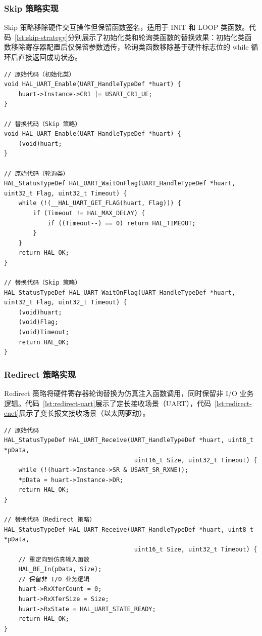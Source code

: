\subsubsection{Skip 策略实现}

Skip 策略移除硬件交互操作但保留函数签名，适用于 INIT 和 LOOP 类函数。代码~\ref{lst:skip-strategy}分别展示了初始化类和轮询类函数的替换效果：初始化类函数移除寄存器配置后仅保留参数透传，轮询类函数移除基于硬件标志位的 while 循环后直接返回成功状态。

\begin{lstlisting}[style=CStyle,abovecaptionskip=0pt,belowcaptionskip=0pt,caption=Skip 策略替换示例（初始化类和轮询类）,label=lst:skip-strategy]
// 原始代码（初始化类）
void HAL_UART_Enable(UART_HandleTypeDef *huart) {
    huart->Instance->CR1 |= USART_CR1_UE;
}

// 替换代码（Skip 策略）
void HAL_UART_Enable(UART_HandleTypeDef *huart) {
    (void)huart;
}

// 原始代码（轮询类）
HAL_StatusTypeDef HAL_UART_WaitOnFlag(UART_HandleTypeDef *huart, uint32_t Flag, uint32_t Timeout) {
    while (!(__HAL_UART_GET_FLAG(huart, Flag))) {
        if (Timeout != HAL_MAX_DELAY) {
            if ((Timeout--) == 0) return HAL_TIMEOUT;
        }
    }
    return HAL_OK;
}

// 替换代码（Skip 策略）
HAL_StatusTypeDef HAL_UART_WaitOnFlag(UART_HandleTypeDef *huart, uint32_t Flag, uint32_t Timeout) {
    (void)huart;
    (void)Flag;
    (void)Timeout;
    return HAL_OK;
}
\end{lstlisting}

\subsubsection{Redirect 策略实现}

Redirect 策略将硬件寄存器轮询替换为仿真注入函数调用，同时保留非 I/O 业务逻辑。代码~\ref{lst:redirect-uart}展示了定长接收场景（UART），代码~\ref{lst:redirect-enet}展示了变长报文接收场景（以太网驱动）。

\begin{lstlisting}[style=CStyle,abovecaptionskip=0pt,belowcaptionskip=0pt,caption=Redirect 策略替换示例（UART 接收函数）,label=lst:redirect-uart]
// 原始代码
HAL_StatusTypeDef HAL_UART_Receive(UART_HandleTypeDef *huart, uint8_t *pData,
                                    uint16_t Size, uint32_t Timeout) {
    while (!(huart->Instance->SR & USART_SR_RXNE));
    *pData = huart->Instance->DR;
    return HAL_OK;
}

// 替换代码（Redirect 策略）
HAL_StatusTypeDef HAL_UART_Receive(UART_HandleTypeDef *huart, uint8_t *pData,
                                    uint16_t Size, uint32_t Timeout) {
    // 重定向到仿真输入函数
    HAL_BE_In(pData, Size);
    // 保留非 I/O 业务逻辑
    huart->RxXferCount = 0;
    huart->RxXferSize = Size;
    huart->RxState = HAL_UART_STATE_READY;
    return HAL_OK;
}
\end{lstlisting}

